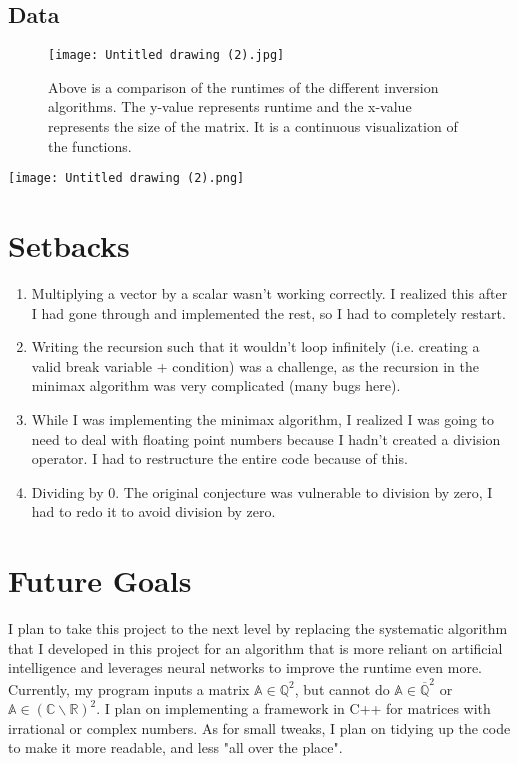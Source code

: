 \documentclass{article}
\begin{document}
\subsection*{Data}
\begin{figure}[h!]
\centering
\texttt{[image: Untitled drawing (2).jpg]}
\caption{Above is a comparison of the runtimes of the different inversion algorithms. The y-value represents runtime and the x-value represents the size of the matrix. It is a continuous visualization of the functions.}
\end{figure}
\begin{center}\texttt{[image: Untitled drawing (2).png]}\end{center}

\section*{Setbacks}
\begin{enumerate}
\item Multiplying a vector by a scalar wasn’t working correctly. I realized       this after I had gone through and implemented the rest, so I had to         completely restart.
\item Writing the recursion such that it wouldn’t loop infinitely (i.e.           creating a valid break variable + condition) was a challenge, as the        recursion in the minimax algorithm was very complicated (many bugs          here).
\item While I was implementing the minimax algorithm, I realized I was going       to need to deal with floating point numbers because I hadn’t created a       division operator. I had to restructure the entire code because of          this.
\item Dividing by 0. The original conjecture was vulnerable to division by        zero, I had to redo it to avoid division by zero.
\end{enumerate}

\section*{Future Goals}
I plan to take this project to the next level by replacing the systematic algorithm that I developed in this project for an algorithm that is more reliant on artificial intelligence and leverages neural networks to improve the runtime even more. Currently, my program inputs a matrix $\mathbb{A}\in \mathbb{Q}^2$, but cannot do $\mathbb{A}\in \overline{\mathbb{Q}}^2$ or $\mathbb{A}\in (\mathbb{C}\backslash \mathbb{R})^2$. I plan on implementing a framework in C++ for matrices with irrational or complex numbers. As for small tweaks, I plan on tidying up the code to make it more readable, and less "all over the place".
\newpage
\end{document}
